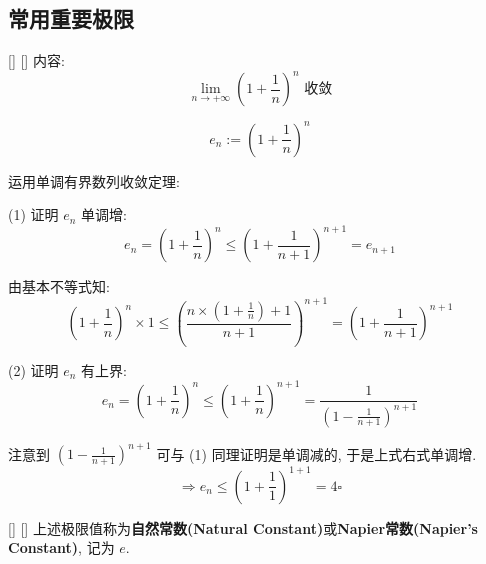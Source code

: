 \documentclass[UTF8]{ctexart}
\begin{document}
			\fi

		\subsection{常用重要极限}
		
			\begin{thm}
			    []
			    {}
			    []
			    []
				内容: 
				\[\lim_{n\to+\infty}\left(1+\frac{1}{n}\right)^n\text{ 收敛}\]
			\end{thm}

                \begin{prf}
                    \[e_n:={\left(1+\frac{1}{n}\right)}^n\]
                
                    运用单调有界数列收敛定理: 

                    (1) 证明 \(e_n\) 单调增: 
                        \[e_n
                        ={\left(1+\frac{1}{n}\right)}^n
                        \leq{\left(1+\frac{1}{n+1}\right)}^{n+1}
                        =e_{n+1}\]
    
                        由基本不等式知: 
                        \[{\left(1+\frac{1}{n}\right)}^n\times 1
                        \leq{\left(\frac{n\times\left(1+\frac{1}{n}\right)+1}{n+1}\right)}^{n+1}
                        ={\left(1+\frac{1}{n+1}\right)}^{n+1}\]

                    (2) 证明 \(e_n\) 有上界: 
                        \[e_n={\left(1+\frac{1}{n}\right)}^n
                        \leq{\left(1+\frac{1}{n}\right)}^{n+1}
                        =\frac{1}{{\left(1-\frac{1}{n+1}\right)}^{n+1}}\]

                        注意到 \({\left(1-\frac{1}{n+1}\right)}^{n+1}\) 可与 (1) 同理证明是单调减的, 于是上式右式单调增. 
                        \[\Longrightarrow e_n\leq{\left(1+\frac{1}{1}\right)}^{1+1}=4\square\]
                \end{prf}

			\begin{dfn}
			    []
			    {}
			    []
			    []
				上述极限值称为\textbf{自然常数(Natural Constant)}或\textbf{Napier常数(Napier's Constant)}, 记为 \(e\). 
			\end{dfn}

                \iffalse
\end{document}
